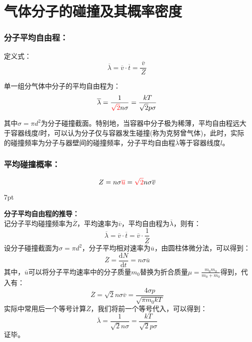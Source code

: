 \documentclass[zihao=-4,UTF8]{report}
\newenvironment{graybox}{%
\def\FrameCommand{%
\hspace{1pt}%
{\color{gray}\small \vrule width 2pt}%
{\color{graybox_color}\vrule width 4pt}%
\colorbox{graybox_color}%
}%
\MakeFramed{\advance\hsize-\width\FrameRestore}%
\noindent\hspace{-4.55pt}%
\begin{adjustwidth}{}{7pt}%
\vspace{2pt}\vspace{2pt}%
}
{%
\vspace{2pt}\end{adjustwidth}\endMakeFramed%
}
\begin{document}
\section{气体分子的碰撞及其概率密度}

\subsubsection{分子平均自由程：}
定义式：
\begin{equation}
    \overline{\lambda} = \overline{v}\cdot \overline{t} = \frac{\ \overline{v}\ }{Z}
\end{equation}\par
单一组分气体中分子的平均自由程为：
\begin{equation}
    \overline{\lambda} = \frac{1}{\textcolor{red}{\sqrt{2}}n \sigma } = \frac{kT}{\sqrt{2}p\sigma}
\end{equation}\par
{\color{gray}\small 其中$\sigma = \pi d^2$为分子碰撞截面。特别地，当容器中分子极为稀薄，平均自由程远大于容器线度$l$时，可以认为分子仅与容器发生碰撞(称为克努曾气体)，此时，实际的碰撞频率为分子与器壁间的碰撞频率，分子平均自由程$\overline{\lambda}$等于容器线度$l$。}
\subsubsection{平均碰撞概率：}
\begin{equation}
    Z = n\sigma \textcolor{red}{\overline{u}} = \textcolor{red}{\sqrt{2}}n\sigma \overline{v}
\end{equation}
\par

\begin{graybox}
    \textbf{分子平均自由程的推导：}\\
    记分子平均碰撞频率为$\overline{Z}$，平均速率为$\overline{v}$，平均自由程为$\overline{\lambda}$，则有：
\begin{equation*}
    \overline{\lambda} =\overline{v}\cdot \overline{t} =\overline{v}\cdot \frac{1}{\overline{Z}}
\end{equation*}
设分子碰撞截面为$\sigma = \pi d^2$，分子平均相对速率为$\overline{u}$，由圆柱体微分法，可以得到：
\begin{equation*}
    \overline{Z} = \frac{\mathrm{d}N}{\mathrm{d}t} = n\sigma \overline{u}
\end{equation*}
其中，$\overline{u}$可以将分子平均速率中的分子质量$m_0$替换为折合质量$\mu = \frac{m_0m_0}{m_0+m_0}$得到，代入有：
\begin{equation*}
    \overline{Z} = \sqrt{2}n\sigma\overline{v}  = \frac{4\sigma p}{\sqrt{\pi m_0kT}}
\end{equation*}
实际中常用后一个等号计算$\overline{Z}$，我们将前一个等号代入，可以得到：
\begin{equation*}
    \overline{\lambda} = \frac{1}{\sqrt{2}n\sigma}= \frac{kT}{\sqrt{2}p\sigma}
\end{equation*}
证毕。
\end{graybox}
\end{document}
